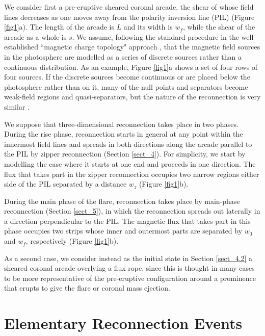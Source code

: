\documentclass[10pt,namedreferneces]{SolarPhysics}
\begin{document}
\begin{article}
We consider first a pre-eruptive sheared coronal arcade, the shear of whose field lines decreases as one moves away from the polarity inversion line (PIL) (Figure \ref{fig1}a).  The length of the arcade is $L$ and its width is $w_f$, while the shear of the arcade as a whole is $s$.  
We assume, following the standard procedure in the well-established ``magnetic charge topology" approach \cite{sweet58a,molodensky77,welsch99,brown99a,longcope02,beveridge02,longcope05b}, that the magnetic field sources in the photosphere are modelled as a series of discrete sources rather than a continuous distribution. As an example, Figure \ref{fig1}a shows a set of four rows of four sources.  If the discrete sources become continuous or are placed below the photosphere rather than on it, many of the null points and separators become weak-field regions and quasi-separators, but the nature of the reconnection is very similar \cite{seehafer86,gorbachev88c,demoulin92a,priest95a}.

We suppose that three-dimensional reconnection takes place in two phases. During the rise phase, reconnection  starts in general at any point within the innermost field lines and spreads in both directions along the arcade parallel to the PIL by  zipper reconnection (Section \ref{sect_4}). For simplicity, we start by modelling the case where it starts at one end and proceeds in one direction. The flux that takes part in the zipper reconnection occupies two narrow regions either side of the PIL separated by a distance $w_z$ (Figure \ref{fig1}b).  

During the main phase of the flare, reconnection takes place by  main-phase reconnection (Section \ref{sect_5}), in which the reconnection spreads out laterally in a direction perpendicular to the PIL. The magnetic flux that takes part in this phase occupies two strips whose inner and outermost parts are separated by $w_0$ and $w_f$, respectively (Figure \ref{fig1}b).  

As a second case, we consider instead as the initial state in Section  \ref{sect_4.2} a sheared coronal arcade overlying a flux rope, since this is thought in many cases to be more representative of the pre-eruptive configuration around a prominence that erupts to give the flare or coronal mass ejection.

\section{Elementary Reconnection Events} 
\label{sect_3}


\end{article}
\end{document}
